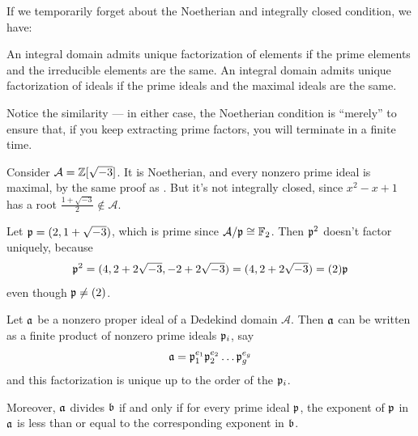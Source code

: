 \begin{remark}
	If we temporarily forget about the Noetherian and integrally closed condition, we have:
	\begin{itemize}
		\ii An integral domain admits unique factorization of elements if the prime elements and the irreducible elements are the same.
		\ii An integral domain admits unique factorization of ideals if the prime ideals and the maximal ideals are the same.
	\end{itemize}
	Notice the similarity --- in either case, the Noetherian condition is ``merely'' to ensure that, if you keep extracting prime factors, you will terminate in a finite time.
\end{remark}

\begin{example}
	Consider $\mathcal A = \mathbb Z[\sqrt{-3}]$.
	It is Noetherian, and every nonzero prime ideal is maximal,
	by the same proof as .
	But it's not integrally closed,
	since $x^2-x+1$ has a root $\frac{1+\sqrt{-3}}{2} \notin \mathcal A$.

	Let $\mathfrak p = (2, 1+\sqrt{-3})$, which is prime since $\mathcal A / \mathfrak p \cong \mathbb F_2$.
	Then $\mathfrak p^2$ doesn't factor uniquely, because
	\[ \mathfrak p^2 = (4, 2+2\sqrt{-3}, -2+2\sqrt{-3}) = (4, 2+2\sqrt{-3}) = (2)\mathfrak p \]
	even though $\mathfrak p \neq (2)$.
\end{example}

\begin{theorem}
	Let $\mathfrak a$ be a nonzero proper ideal of a Dedekind domain $\mathcal A$.
	Then $\mathfrak a$ can be written as a finite product of nonzero prime ideals $\mathfrak p_i$, say
	\[ \mathfrak a = \mathfrak p_1^{e_1} \mathfrak p_2^{e_2} \dots \mathfrak p_g^{e_g} \]
	and this factorization is unique up to the order of the $\mathfrak p_i$.

	Moreover, $\mathfrak a$ divides $\mathfrak b$ if and only if for every prime ideal $\mathfrak p$,
	the exponent of $\mathfrak p$ in $\mathfrak a$ is less than or equal to the corresponding exponent in $\mathfrak b$.
\end{theorem}

